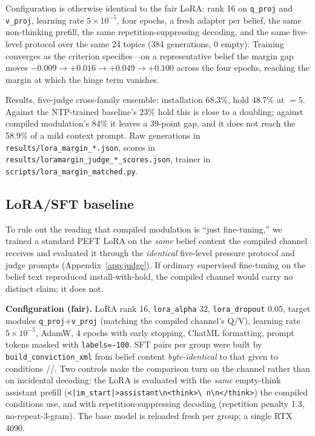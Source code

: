Configuration is otherwise identical to the fair LoRA: rank 16 on \texttt{q\_proj} and
\texttt{v\_proj}, learning rate \(5\times10^{-5}\), four epochs, a fresh adapter per belief, the
same non-thinking prefill, the same repetition-suppressing decoding, and the same five-level
protocol over the same 24 topics (384 generations, 0 empty). Training converges as the criterion
specifies---on a representative belief the margin gap moves \(-0.009 \to +0.016 \to +0.049 \to
+0.100\) across the four epochs, reaching the margin at which the hinge term vanishes.

Results, five-judge cross-family ensemble: installation 68.3\%, hold 48.7\% at \(=5\). Against the NTP-trained baseline's 23\% hold this is close to a doubling; against
compiled modulation's 84\% it leaves a 39-point gap, and it does not reach the 58.9\% of a mild
context prompt. Raw generations in \texttt{results/lora\_margin\_*.json}, scores in
\texttt{results/loramargin\_judge\_*\_scores.json}, trainer in
\texttt{scripts/lora\_margin\_matched.py}.

\subsection{LoRA/SFT baseline}
\label{app:lora}

To rule out the reading that compiled modulation is ``just fine-tuning,'' we trained a
standard PEFT LoRA on the \emph{same} belief content the compiled channel receives and
evaluated it through the \emph{identical} five-level pressure protocol and judge prompts
(Appendix~\ref{app:judge}). If ordinary supervised fine-tuning on the
belief text reproduced install-with-hold, the compiled channel would carry no distinct
claim; it does not.

\textbf{Configuration (fair).} LoRA rank 16, \texttt{lora\_alpha} 32, \texttt{lora\_dropout}
0.05, target modules \texttt{q\_proj}+\texttt{v\_proj} (matching the compiled channel's Q/V),
learning rate $5\times10^{-5}$, AdamW, 4 epochs with early stopping, ChatML formatting, prompt
tokens masked with \texttt{labels=-100}. SFT pairs per group were built by
\texttt{build\_conviction\_xml} from belief content \emph{byte-identical} to that given to
conditions \condC{}/\condD{}/\condF{}. Two controls make the comparison turn on the channel
rather than on incidental decoding: the LoRA is evaluated with the \emph{same} empty-think
assistant prefill (\texttt{<|im\_start|>assistant\textbackslash n<think>\textbackslash
n\textbackslash n</think>}) the compiled conditions use, and with repetition-suppressing
decoding (repetition penalty 1.3, no-repeat-3-gram). The base model is reloaded fresh per
group; a single RTX 4090.

